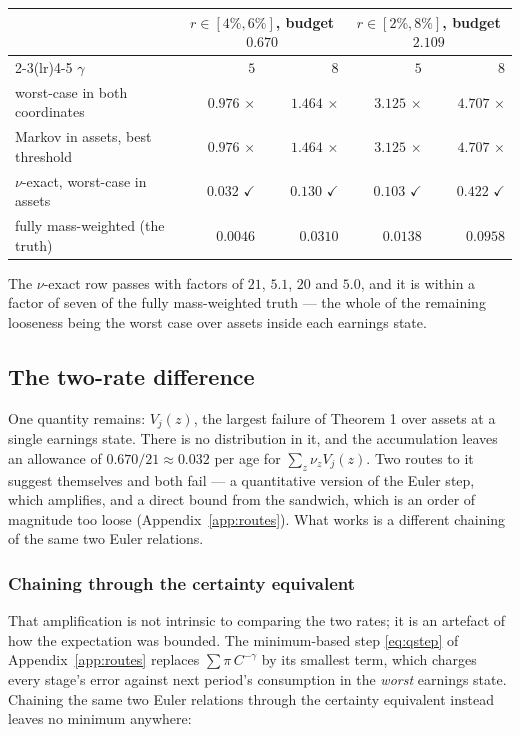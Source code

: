 \begin{center}
\begin{tabular}{lrrrr}
\toprule
& \multicolumn{2}{c}{$r\in[4\%,6\%]$, budget $0.670$}
& \multicolumn{2}{c}{$r\in[2\%,8\%]$, budget $2.109$}\\
\cmidrule(lr){2-3}\cmidrule(lr){4-5}
$\gamma$ & $5$ & $8$ & $5$ & $8$\\
\midrule
worst-case in both coordinates & $0.976$ $\times$ & $1.464$ $\times$ & $3.125$ $\times$ & $4.707$ $\times$\\
Markov in assets, best threshold & $0.976$ $\times$ & $1.464$ $\times$ & $3.125$ $\times$ & $4.707$ $\times$\\
$\nu$-exact, worst-case in assets & $\mathbf{0.032}$ $\checkmark$ & $\mathbf{0.130}$ $\checkmark$ & $\mathbf{0.103}$ $\checkmark$ & $\mathbf{0.422}$ $\checkmark$\\
fully mass-weighted (the truth) & $0.0046$ & $0.0310$ & $0.0138$ & $0.0958$\\
\bottomrule
\end{tabular}
\end{center}

The $\nu$-exact row passes with factors of $21$, $5.1$, $20$ and $5.0$, and it is within a factor of
seven of the fully mass-weighted truth --- the whole of the remaining looseness being the worst case
over assets inside each earnings state.

\subsection{The two-rate difference}

One quantity remains: $V_j(z)$, the largest failure of Theorem 1 over assets at a single earnings
state. There is no distribution in it, and the accumulation leaves an allowance of
$0.670/21\approx0.032$ per age for $\sum_z\nu_zV_j(z)$. Two routes to it suggest themselves and both
fail --- a quantitative version of the Euler step, which amplifies, and a direct bound from the
sandwich, which is an order of magnitude too loose (Appendix~\ref{app:routes}). What works is a
different chaining of the same two Euler relations.

\subsubsection*{Chaining through the certainty equivalent}

That amplification is not intrinsic to comparing the two rates; it is an artefact of how the
expectation was bounded. The minimum-based step \eqref{eq:qstep} of Appendix~\ref{app:routes}
replaces $\sum\pi\,C^{-\gamma}$ by its smallest term,
which charges every stage's error against next period's consumption in the \emph{worst} earnings
state. Chaining the same two Euler relations through the certainty equivalent instead leaves no
minimum anywhere:


